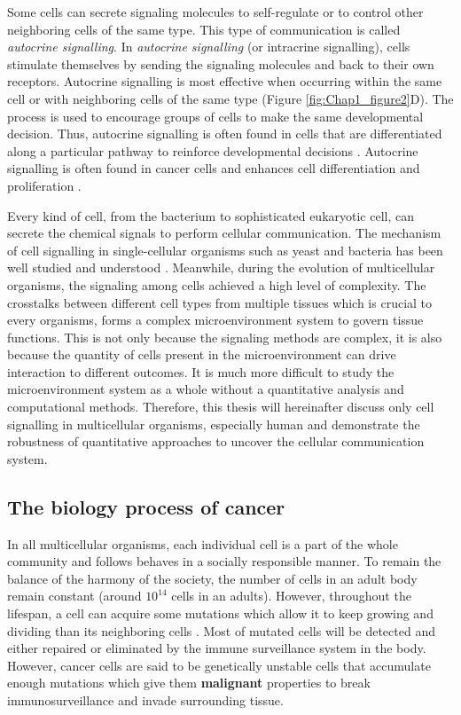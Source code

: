 Some cells can secrete signaling molecules to self-regulate or to control other neighboring cells of the same type. This type of communication is called \textit{autocrine signalling}. In \textit{autocrine signalling} (or intracrine signalling), cells stimulate themselves by sending the signaling molecules and back to their own receptors. Autocrine signalling is most effective when occurring within the same cell or with neighboring cells of the same type (Figure \ref{fig:Chap1_figure2}D). The process is used to encourage groups of cells to make the same developmental decision. Thus, autocrine signalling is often found in cells that are differentiated along a particular pathway to reinforce developmental decisions \cite{alberts2018molecular}. Autocrine signalling is often found in cancer cells and enhances cell differentiation and proliferation \cite{sporn1985autocrine}.  

Every kind of cell, from the bacterium to sophisticated eukaryotic cell, can secrete the chemical signals to perform cellular communication. The mechanism of cell signalling in single-cellular organisms such as yeast and bacteria has been well studied and understood \cite{alberts2018molecular}. Meanwhile, during the evolution of multicellular organisms, the signaling among cells achieved a high level of complexity. The crosstalks between different cell types from multiple tissues which is crucial to every organisms, forms a complex microenvironment system to govern tissue functions. This is not only because the signaling methods are complex, it is also because the quantity of cells present in the microenvironment can drive interaction to different outcomes. It is much more difficult to study the microenvironment system as a whole without a quantitative analysis and computational methods. Therefore, this thesis will hereinafter discuss only cell signalling in multicellular organisms, especially human and demonstrate the robustness of quantitative approaches to uncover the cellular communication system. 

\subsection{The biology process of cancer}
In all multicellular organisms, each individual cell is a part of the whole community and follows behaves in a socially responsible manner. To remain the balance of the harmony of the society, the number of cells in an adult body remain constant (around $10^{14}$ cells in an adults). However, throughout the lifespan, a cell can acquire some mutations which allow it to keep growing and dividing than its neighboring cells \cite{alberts2018molecular, greaves2012clonal}. Most of mutated cells will be detected and either repaired or eliminated by the immune surveillance system in the body. However, cancer cells are said to be genetically unstable cells that accumulate enough mutations which give them \textbf{malignant} properties to break immunosurveillance and invade surrounding tissue. 

